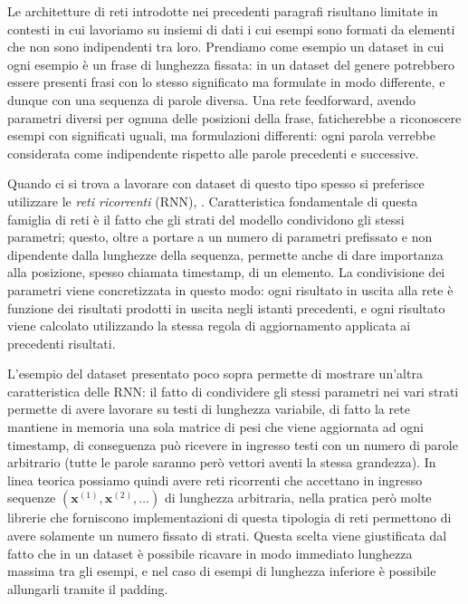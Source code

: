 \documentclass[../../main.tex]{subfiles}
\begin{document}
Le architetture di reti introdotte nei precedenti paragrafi risultano limitate in contesti in cui lavoriamo su insiemi di dati i cui esempi sono formati da elementi che non sono indipendenti tra loro. Prendiamo come esempio un dataset in cui ogni esempio è un frase di lunghezza fissata: in un dataset del genere potrebbero essere presenti frasi con lo stesso significato ma formulate in modo differente, e dunque con una sequenza di parole diversa. Una rete feedforward, avendo parametri diversi per ognuna delle posizioni della frase, faticherebbe a riconoscere esempi con significati uguali, ma formulazioni differenti: ogni parola verrebbe considerata come indipendente rispetto alle parole precedenti e successive.

Quando ci si trova a lavorare con dataset di questo tipo spesso si preferisce utilizzare le \textit{reti ricorrenti} (RNN), \cite{rumelhart:errorpropnonote}. Caratteristica fondamentale di questa famiglia di reti è il fatto che gli strati del modello condividono gli stessi parametri; questo, oltre a portare a un numero di parametri prefissato e non dipendente dalla lunghezze della sequenza, permette anche di dare importanza alla posizione, spesso chiamata timestamp, di un elemento. La condivisione dei parametri viene concretizzata in questo modo: ogni risultato in uscita alla rete è funzione dei risultati prodotti in uscita negli istanti precedenti, e ogni risultato viene calcolato utilizzando la stessa regola di aggiornamento applicata ai precedenti risultati.

L'esempio del dataset presentato poco sopra permette di mostrare un'altra caratteristica delle RNN: il fatto di condividere gli stessi parametri nei vari strati permette di avere lavorare su testi di lunghezza variabile, di fatto la rete mantiene in memoria una sola matrice di pesi che viene aggiornata ad ogni timestamp, di conseguenza può ricevere in ingresso testi con un numero di parole arbitrario (tutte le parole saranno però vettori aventi la stessa grandezza). In linea teorica possiamo quindi avere reti ricorrenti che accettano in ingresso sequenze $(\boldsymbol{x}^{(1)}, \boldsymbol{x}^{(2)}, \dots)$ di lunghezza arbitraria, nella pratica però molte librerie che forniscono implementazioni di questa tipologia di reti permettono di avere solamente un numero fissato di strati. Questa scelta viene giustificata dal fatto che in un dataset è possibile ricavare in modo immediato lunghezza massima tra gli esempi, e nel caso di esempi di lunghezza inferiore è possibile allungarli tramite il padding.
\end{document}
